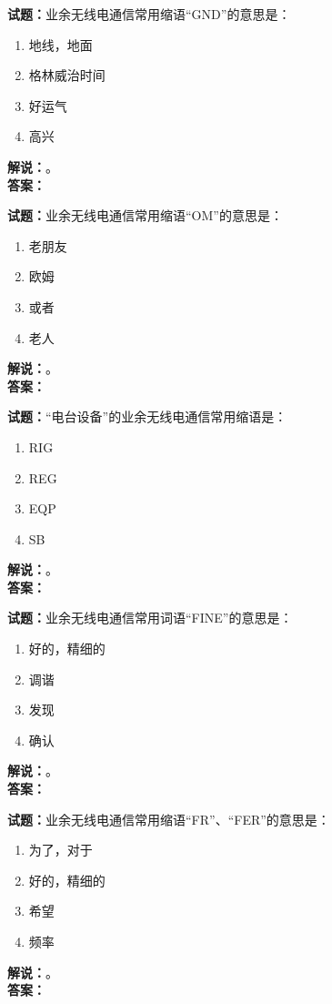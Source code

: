 \documentclass{ctexbook}
\begin{document}
\bigskip

\noindent\textbf{试题：}业余无线电通信常用缩语“GND”的意思是：
\begin{enumerate}[leftmargin=3em]
  \item 地线，地面
  \item 格林威治时间
  \item 好运气
  \item 高兴
\end{enumerate}
\noindent\textbf{解说：}\textbf{}。\\\noindent\textbf{答案：}

\bigskip

\noindent\textbf{试题：}业余无线电通信常用缩语“OM”的意思是：
\begin{enumerate}[leftmargin=3em]
  \item 老朋友
  \item 欧姆
  \item 或者
  \item 老人
\end{enumerate}
\noindent\textbf{解说：}\textbf{}。\\\noindent\textbf{答案：}

\bigskip

\noindent\textbf{试题：}“电台设备”的业余无线电通信常用缩语是：
\begin{enumerate}[leftmargin=3em]
  \item RIG
  \item REG
  \item EQP
  \item SB
\end{enumerate}
\noindent\textbf{解说：}\textbf{}。\\\noindent\textbf{答案：}

\bigskip

\noindent\textbf{试题：}业余无线电通信常用词语“FINE”的意思是：
\begin{enumerate}[leftmargin=3em]
  \item 好的，精细的
  \item 调谐
  \item 发现
  \item 确认
\end{enumerate}
\noindent\textbf{解说：}\textbf{}。\\\noindent\textbf{答案：}

\bigskip

\noindent\textbf{试题：}业余无线电通信常用缩语“FR”、“FER”的意思是：
\begin{enumerate}[leftmargin=3em]
  \item 为了，对于
  \item 好的，精细的
  \item 希望
  \item 频率
\end{enumerate}
\noindent\textbf{解说：}\textbf{}。\\\noindent\textbf{答案：}
\end{document}
